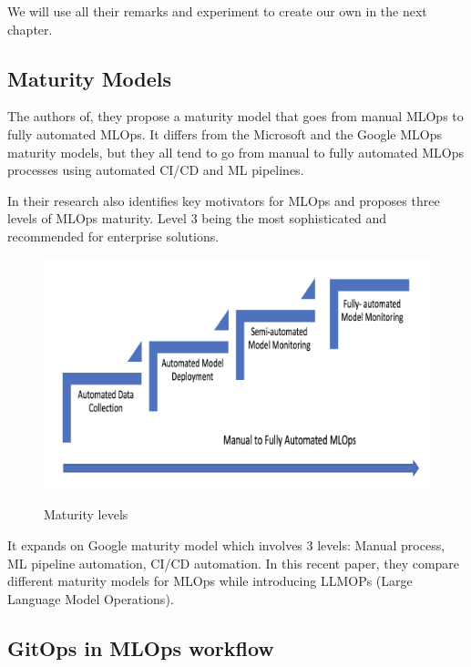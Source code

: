 We will use all their remarks and experiment to create our own in the next chapter.

\subsection{Maturity Models}\label{subsec:matutiry-models}
The authors of\cite{mlops-maturity-model}, they propose a maturity model that goes from manual MLOps to fully automated MLOps.
It differs from the Microsoft and the Google MLOps maturity models,
but they all tend to go from manual to fully automated MLOps processes using automated CI/CD and
ML pipelines.\cite{mlops-definition-tools-and-challenge}

In their research\cite{inproceedings} also identifies key motivators for MLOps and proposes three levels of MLOps maturity.
Level 3 being the most sophisticated and recommended for enterprise solutions.

\begin{figure}[!htbp]
    \caption{Maturity levels \cite{mlops-maturity-model}}
    \centering
    \includegraphics[scale=0.5]{images/maturity-levels}
    \label{fig:maturity}
\end{figure}

It expands on Google maturity model\cite{google-mlops} which involves 3 levels: Manual process, ML pipeline automation, CI/CD automation.
In this recent paper\cite{unknown}, they compare different maturity models for MLOps while introducing LLMOPs (Large Language Model Operations).

\subsection{GitOps in MLOps workflow}\label{subsec:gitops-in-mlops-workflow}

